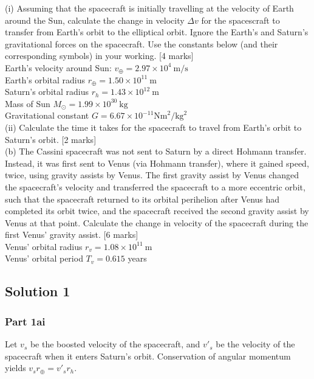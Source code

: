\documentclass{article}
\begin{document}
(i) Assuming that the spacecraft is initially travelling at the velocity of Earth around the Sun, calculate the change in velocity $\Delta v$ for the spacescraft to transfer from Earth's orbit to the elliptical orbit. Ignore the Earth's and Saturn's gravitational forces on the spacecraft. Use the constants below (and their corresponding symbols) in your working. [4 marks] \\
Earth's velocity around Sun: $v_{\oplus}=2.97 \times 10^{4} \mathrm{~m} / \mathrm{s}$ \\
Earth's orbital radius $r_{\oplus}=1.50 \times 10^{11} \mathrm{~m}$ \\
Saturn's orbital radius $r_{h}=1.43 \times 10^{12} \mathrm{~m}$ \\
Mass of Sun $M_{\odot}=1.99 \times 10^{30} \mathrm{~kg}$ \\
Gravitational constant $G=6.67 \times 10^{-11} \mathrm{Nm}^{2} / \mathrm{kg}^{2}$ \\
(ii) Calculate the time it takes for the spacecraft to travel from Earth's orbit to Saturn's orbit. [2 marks] \\
(b) The Cassini spacecraft was not sent to Saturn by a direct Hohmann transfer. Instead, it was first sent to Venus (via Hohmann transfer), where it gained speed, twice, using gravity assists by Venus. The first gravity assist by Venus changed the spacecraft's velocity and transferred the spacecraft to a more eccentric orbit, such that the spacecraft returned to its orbital perihelion after Venus had completed its orbit twice, and the spacecraft received the second gravity assist by Venus at that point. Calculate the change in velocity of the spacecraft during the first Venus' gravity assist. [6 marks]\\
Venus' orbital radius $r_{v}=1.08 \times 10^{11} \mathrm{~m}$ \\
Venus' orbital period $T_{v}=0.615$ years \\

\subsection{Solution 1}
\subsubsection{Part 1ai}
Let $v_s$ be the boosted velocity of the spacecraft, and $v'_s$ be the velocity of the spacecraft when it enters Saturn's orbit. Conservation of angular momentum yields $v_s r_\oplus = v'_s r_h$.
\end{document}
